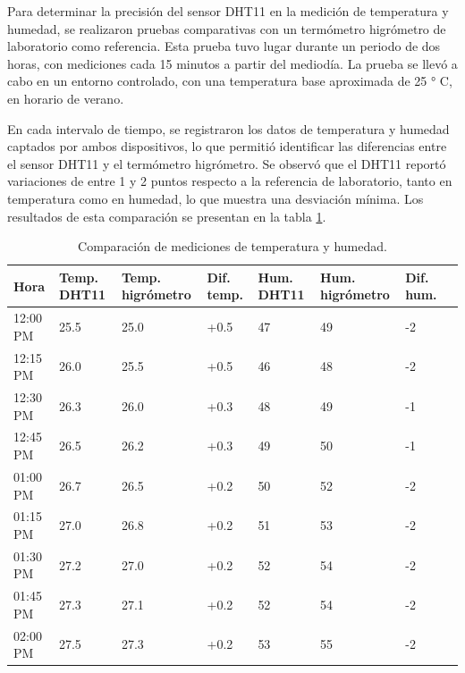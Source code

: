 Para determinar la precisión del sensor DHT11 en la medición de temperatura y humedad, se realizaron pruebas comparativas con un termómetro higrómetro de laboratorio como referencia. Esta prueba tuvo lugar durante un periodo de dos horas, con mediciones cada 15 minutos a partir del mediodía. La prueba se llevó a cabo en un entorno controlado, con una temperatura base aproximada de 25 ° C, en horario de verano.

En cada intervalo de tiempo, se registraron los datos de temperatura y humedad captados por ambos dispositivos, lo que permitió identificar las diferencias entre el sensor DHT11 y el termómetro higrómetro. Se observó que el DHT11 reportó variaciones de entre 1 y 2 puntos respecto a la referencia de laboratorio, tanto en temperatura como en humedad, lo que muestra una desviación mínima. Los resultados de esta comparación se presentan en la tabla \ref{tab:DHT11_comparacion}.

\newpage

\begin{table}[h]
    \centering
    \caption[Comparación de mediciones de temperatura y humedad]{Comparación de mediciones de temperatura y humedad.}
    \begin{tabularx}{\textwidth}{l X X X X X X X}  %
        \toprule
        \textbf{Hora} & \textbf{Temp. DHT11} & \textbf{Temp. higrómetro} & \textbf{Dif. temp.} & \textbf{Hum. DHT11} & \textbf{Hum. higrómetro} & \textbf{Dif. hum.} \\
        \midrule
        12:00 PM & 25.5 & 25.0 & +0.5 & 47 & 49 & -2\\		
        12:15 PM & 26.0 & 25.5 & +0.5 & 46 & 48	& -2\\
        12:30 PM & 26.3 & 26.0 & +0.3 & 48 & 49 & -1\\
        12:45 PM & 26.5 & 26.2 & +0.3 & 49 & 50 & -1\\
        01:00 PM & 26.7 & 26.5 & +0.2 & 50 & 52 & -2\\
        01:15 PM & 27.0 & 26.8 & +0.2 & 51 & 53 & -2\\
        01:30 PM & 27.2 & 27.0 & +0.2 & 52 & 54 & -2\\
        01:45 PM & 27.3 & 27.1 & +0.2 & 52 & 54 & -2\\
        02:00 PM & 27.5 & 27.3 & +0.2 & 53 & 55 & -2\\
        \bottomrule
    \end{tabularx}
    \label{tab:DHT11_comparacion}
\end{table}

